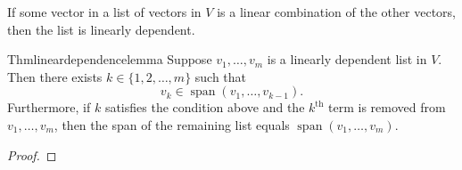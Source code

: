 If some vector in a list of vectors in $V$ is a linear combination of the other vectors, then the list is linearly dependent.

\begin{reference}{Thm}{lineardependencelemma}
  Suppose $v_1, \ldots, v_m$ is a linearly dependent list in $V$. Then there exists
  $k \in \{1, 2, \ldots, m\}$ such that
  \[
    v_k \in \operatorname{span}(v_1, \ldots, v_{k-1}).
  \]
  Furthermore, if $k$ satisfies the condition above and the $k^{\text{th}}$ term is removed from
  $v_1, \ldots, v_m$, then the span of the remaining list equals $\operatorname{span}(v_1, \ldots, v_m)$.
\end{reference}

\begin{proof}

\end{proof}
